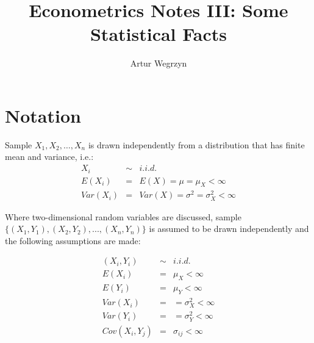 \documentclass[12pt]{article}
\begin{document}
\title{Econometrics Notes III: Some Statistical Facts}
\author{Artur Wegrzyn}
\maketitle



\tableofcontents



\section{Notation}
Sample $X_1, X_2, \dots, X_n$ is drawn independently from a distribution that
has finite mean and variance, i.e.:
\begin{eqnarray*}
X_i &\sim & i.i.d. \\
E(X_i) &=& E(X) = \mu = \mu_X < \infty \\
Var(X_i) &=& Var(X) = \sigma^2 = \sigma^2_X < \infty
\end{eqnarray*}

Where two-dimensional random variables are discussed, sample 
$\{ (X_1 ,Y_1), (X_2, Y_2), ..., (X_n, Y_n) \}$ is assumed to be drawn independently 
and the following assumptions are made:

\begin{eqnarray*}
(X_i, Y_i) &\sim & i.i.d. \\
E(X_i) &=& \mu_X < \infty \\
E(Y_i) &=& \mu_Y < \infty \\
Var(X_i) &=& = \sigma^2_X < \infty \\
Var(Y_i) &=& = \sigma^2_Y < \infty \\ 
Cov(X_i, Y_j) &=& \sigma_{ij} < \infty 
\end{eqnarray*}
\end{document}
